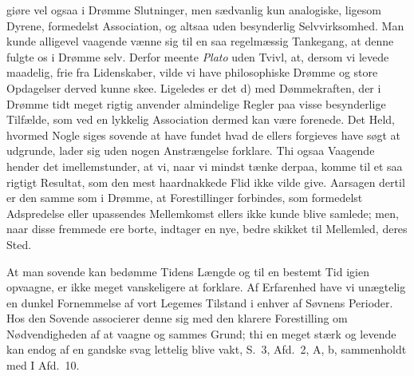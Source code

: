 \documentclass[12pt,a4paper]{article}
\newcommand{\opage}[1]{\marginnote{\footnotesize\textit{[#1]}}}
\begin{document}
giøre vel ogsaa i Drømme Slutninger, men sædvanlig kun analogiske, ligesom Dyrene,
formedelst Association, og altsaa uden besynderlig Selvvirksomhed. Man kunde alligevel
vaagende vænne sig til en saa regelmæssig Tankegang, at denne fulgte os i Drømme selv.
Derfor meente \emph{Plato} uden Tvivl, at, dersom vi levede maadelig, frie fra
Lidenskaber, vilde vi have philosophiske Drømme og store Opdagelser derved kunne skee.
Ligeledes er det d) med Dømmekraften, der i Drømme tidt meget rigtig anvender almindelige
Regler paa visse besynderlige Tilfælde, som ved en lykkelig Association dermed kan være
forenede. Det Held, hvormed Nogle siges sovende at have fundet hvad de ellers forgieves
have søgt at udgrunde, lader sig uden nogen Anstrængelse forklare. Thi ogsaa Vaagende
hender det imellemstunder, at vi, naar vi mindst tænke derpaa,
\opage{130} komme til et saa rigtigt Resultat, som den mest haardnakkede Flid ikke vilde give.
Aarsagen dertil er den samme som i Drømme, at Forestillinger forbindes, som formedelst
Adspredelse eller upassendes Mellemkomst ellers ikke kunde blive samlede; men, naar disse
fremmede ere borte, indtager en nye, bedre skikket til Mellemled, deres Sted.

At man sovende kan bedømme Tidens Længde og til en bestemt Tid igien opvaagne, er ikke
meget vanskeligere at forklare. Af Erfarenhed have vi unægtelig en dunkel Fornemmelse af
vort Legemes Tilstand i enhver af Søvnens Perioder. Hos den Sovende associerer denne sig
med den klarere Forestilling om Nødvendigheden af at vaagne og sammes Grund; thi en meget
stærk og levende kan endog af en gandske svag lettelig blive vakt, S.~3, Afd.~2, A, b,
sammenholdt med I Afd.~10.
\end{document}
